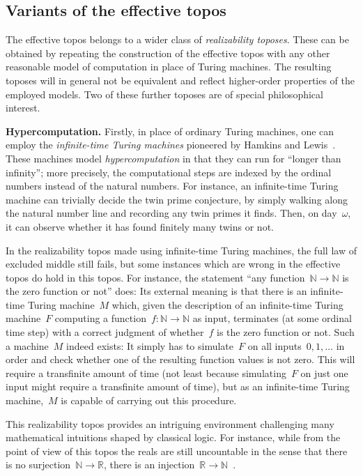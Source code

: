 \documentclass[oneside]{amsart}
\theoremstyle{definition}
\theoremstyle{plain}
\theoremstyle{remark}
\newcommand{\NN}{\mathbb{N}}
\newcommand{\RR}{\mathbb{R}}
\renewcommand{\_}{\mathpunct{.}\,}
\newcommand{\effective}{ef{}fective\xspace}
\newcommand{\?}{\,{:}\,}
\renewcommand{\paragraph}[1]{\noindent\textbf{#1.}}
\begin{document}
\subsection{Variants of the \effective topos} The \effective topos belongs to a
wider class of \emph{realizability toposes}. These can be obtained by repeating
the construction of the \effective topos with any other reasonable model of
computation in place of Turing machines. The resulting toposes will in general
not be equivalent and reflect higher-order properties of the employed models.
Two of these further toposes are of special philosophical interest.

\bigskip
\paragraph{Hypercomputation}
Firstly, in place of ordinary Turing machines, one can employ the
\emph{infinite-time Turing machines} pioneered by Hamkins and
Lewis~\cite{hamkins-lewis:ittm}. These machines model \emph{hypercomputation}
in that they can run for ``longer than infinity''; more precisely, the
computational steps are indexed by the ordinal numbers instead of the natural
numbers. For instance, an infinite-time Turing machine can trivially decide the
twin prime conjecture, by simply walking along the natural number line and
recording any twin primes it finds. Then, on day~$\omega$, it can observe
whether it has found finitely many twins or not.

In the realizability topos made using infinite-time Turing machines, the full
law of excluded middle still fails, but some instances which are wrong in the
\effective topos do hold in this topos. For instance, the statement ``any
function~$\NN \to \NN$ is the zero function or not'' does: Its external meaning
is that there is an infinite-time Turing machine~$M$ which, given the
description of an infinite-time Turing machine~$F$ computing a function~$f :
\NN \to \NN$ as input, terminates (at some ordinal time step) with a correct
judgment of whether~$f$ is the zero function or not. Such a machine~$M$ indeed
exists: It simply has to simulate~$F$ on all inputs~$0,1,\ldots$ in order and
check whether one of the resulting function values is not zero. This
will require a transfinite amount of time (not least because simulating~$F$ on
just one input might require a transfinite amount of time), but as an
infinite-time Turing machine,~$M$ is capable of carrying out this procedure.

This realizability topos provides an intriguing environment challenging many
mathematical intuitions shaped by classical logic. For instance, while from the
point of view of this topos the reals are still uncountable in the sense that
there is no surjection~$\NN \to \RR$, there is an injection~$\RR \to
\NN$~\cite{bauer:injection}.
\end{document}
